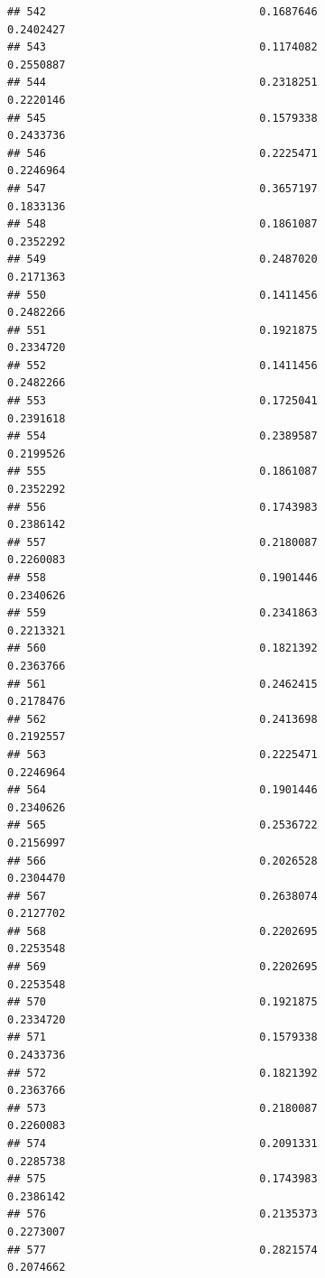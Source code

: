 \documentclass[
  american,
  man,floatsintext]{apa7}
\begin{document}
\begin{verbatim}
## 542                                 0.1687646               0.2402427
## 543                                 0.1174082               0.2550887
## 544                                 0.2318251               0.2220146
## 545                                 0.1579338               0.2433736
## 546                                 0.2225471               0.2246964
## 547                                 0.3657197               0.1833136
## 548                                 0.1861087               0.2352292
## 549                                 0.2487020               0.2171363
## 550                                 0.1411456               0.2482266
## 551                                 0.1921875               0.2334720
## 552                                 0.1411456               0.2482266
## 553                                 0.1725041               0.2391618
## 554                                 0.2389587               0.2199526
## 555                                 0.1861087               0.2352292
## 556                                 0.1743983               0.2386142
## 557                                 0.2180087               0.2260083
## 558                                 0.1901446               0.2340626
## 559                                 0.2341863               0.2213321
## 560                                 0.1821392               0.2363766
## 561                                 0.2462415               0.2178476
## 562                                 0.2413698               0.2192557
## 563                                 0.2225471               0.2246964
## 564                                 0.1901446               0.2340626
## 565                                 0.2536722               0.2156997
## 566                                 0.2026528               0.2304470
## 567                                 0.2638074               0.2127702
## 568                                 0.2202695               0.2253548
## 569                                 0.2202695               0.2253548
## 570                                 0.1921875               0.2334720
## 571                                 0.1579338               0.2433736
## 572                                 0.1821392               0.2363766
## 573                                 0.2180087               0.2260083
## 574                                 0.2091331               0.2285738
## 575                                 0.1743983               0.2386142
## 576                                 0.2135373               0.2273007
## 577                                 0.2821574               0.2074662

\end{verbatim}
\end{document}
